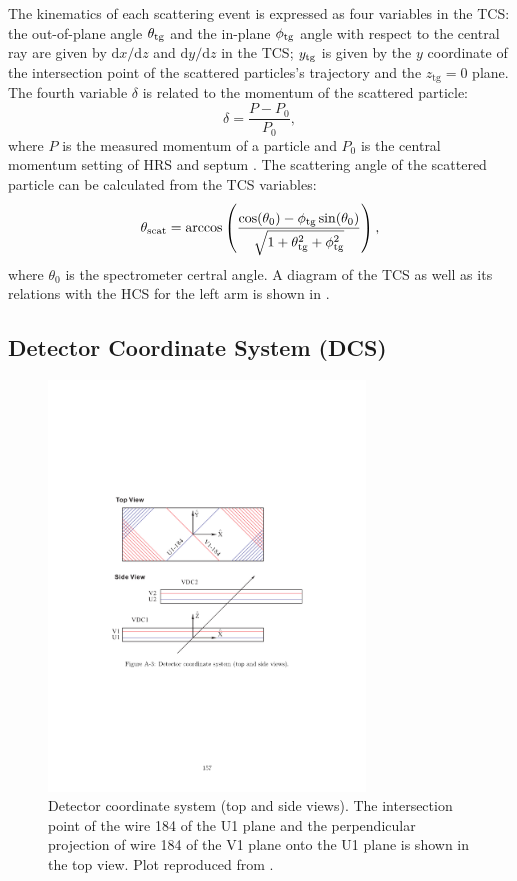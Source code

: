 The kinematics of each scattering event is expressed as four variables in the TCS: the out-of-plane angle $\theta_{\mathrm{tg}}$ and the in-plane $\phi_{\mathrm{tg}}$ angle with respect to the central ray are given by $\mathrm{d}x/\mathrm{d}z$ and $\mathrm{d}y/\mathrm{d}z$ in the TCS; $y_{\mathrm{tg}}$ is given by the $y$ coordinate of the intersection point of the scattered particles's trajectory and the $z_{\mathrm{tg}}=0$ plane. The fourth variable $\delta$ is related to the momentum of the scattered particle:
\begin{equation} \label{C6S1SS2E1}
\delta = \frac{P-P_0}{P_0},
\end{equation}
where $P$ is the measured momentum of a particle and $P_0$ is the central momentum setting of HRS and septum \cite{Liyanage2002}. The scattering angle of the scattered particle can be calculated from the TCS variables:
\begin{equation} \label{C6S1SS2E2}
\theta_{\mathrm{scat}} = \arccos\left(\frac{\cos(\theta_0)-\phi_{\mathrm{tg}}\sin(\theta_0)}{\sqrt{1+\theta_{\mathrm{tg}}^2+\phi_{\mathrm{tg}}^2}}\right),
\end{equation}
where $\theta_0$ is the spectrometer certral angle. A diagram of the TCS as well as its relations with the HCS for the left arm is shown in .

\subsection[Detector Coordinate System]{Detector Coordinate System (DCS)}
\label{C6S1SS3}

\begin{figure}[tb!]
  \centering
  \includegraphics[width=0.75\textwidth]{figs/DCS.pdf}
  \caption[Detector coordinate system.]{Detector coordinate system (top and side views). The intersection point of the wire 184 of the U1 plane and the perpendicular projection of wire 184 of the V1 plane onto the U1 plane is shown in the top view. Plot reproduced from \cite{Qiang2007}. \label{C6S1SS3F1}}
\end{figure}

